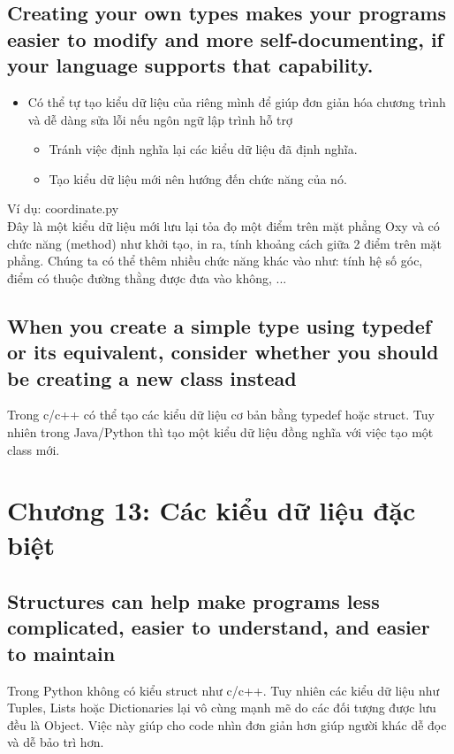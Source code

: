 \documentclass{article}
\begin{document}
    \subsection{Creating your own types makes your programs easier to modify and more self-documenting, if your language supports that capability.}
    \begin{itemize}
        \item Có thể tự tạo kiểu dữ liệu của riêng mình để giúp đơn giản hóa chương trình và dễ dàng sửa lỗi nếu ngôn ngữ lập trình hỗ trợ
        \begin{itemize}
            \item Tránh việc định nghĩa lại các kiểu dữ liệu đã định nghĩa.
            \item Tạo kiểu dữ liệu mới nên hướng đến chức năng của nó.
        \end{itemize}
    \end{itemize}
    
    Ví dụ:  coordinate.py \\
    Đây là một kiểu dữ liệu mới lưu lại tỏa đọ một điểm trên mặt phẳng Oxy và có chức năng (method) như khởi tạo, in ra, tính khoảng cách giữa 2 điểm trên mặt phẳng. Chúng ta có thể thêm nhiều chức năng khác vào như: tính hệ số góc, điểm có thuộc đường thằng được đưa vào không, ...
    \subsection{When you create a simple type using typedef or its equivalent, consider whether you should be creating a new class instead}
    Trong c/c++ có thể tạo các kiểu dữ liệu cơ bản bằng typedef hoặc struct. Tuy nhiên trong Java/Python thì tạo một kiểu dữ liệu đồng nghĩa với việc tạo một class mới.
    
\section{Chương 13: Các kiểu dữ liệu đặc biệt}
    \subsection{Structures can help make programs less complicated, easier to understand, and easier to maintain}
    Trong Python không có kiểu struct như c/c++. Tuy nhiên các kiểu dữ liệu như Tuples, Lists hoặc Dictionaries lại vô cùng mạnh mẽ do các đối tượng được lưu đều là Object. Việc này giúp cho code nhìn đơn giản hơn giúp người khác dễ đọc và dễ bảo trì hơn.
    
\end{document}
